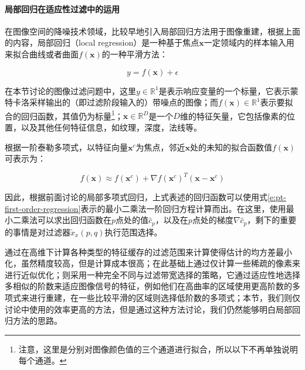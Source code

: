 \paragraph{局部回归在适应性过滤中的运用}
在图像空间的降噪技术领域，\cite{a:AdaptiveRenderingbasedonWeightedLocalRegression}比较早地引入局部回归方法用于图像重建，根据上面的内容，局部回归（local regression）是一种基于焦点$\mathbf{x}$一定领域内的样本输入用来拟合曲线或者曲面$f(\mathbf{x})$的一种平滑方法：

\begin{equation}
	y=f(\mathbf{x})+\epsilon
\end{equation}

\noindent 在本节讨论的图像过滤问题中，这里$y\in\mathbb{R}^{1}$是表示响应变量的一个标量，它表示蒙特卡洛采样输出的（即过滤阶段输入的）带噪点的图像；而$f(\mathbf{x})\in\mathbb{R}^{1}$表示要拟合的回归函数，其值仍为标量\footnote{注意，这里是分别对图像颜色值的三个通道进行拟合，所以以下不再单独说明每个通道。}；$\mathbf{x}\in\mathbb{R}^{D}$是一个$D$维的特征矢量，它包括像素的位置，以及其他任何特征信息，如纹理，深度，法线等。

根据一阶泰勒多项式，以特征向量$\mathbf{x}^{c}$为焦点，邻近$\mathbf{x}$处的未知的拟合函数值$f(\mathbf{x})$可表示为：

\begin{equation}
	f(\mathbf{x})\approx f(\mathbf{x}^{c})+\nabla f(\mathbf{x}^{c})^{T}(\mathbf{x}-\mathbf{x}^{c})
\end{equation}

\noindent 因此，根据前面讨论的局部多项式回归，上式表述的回归函数可以使用式\ref{e:pt-first-order-regression}表示的最小二乘法一阶回归方程计算而出。在这里，使用最小二乘法可以求出回归函数在$p$点处的值$\hat{c}_p$，以及在$p$点处的梯度$\nabla \hat{c}_p$，剩下的重要的事情是对过滤器$\tilde{x}_x(p,q)$执行范围选择。

\cite{a:AdaptiveRenderingbasedonWeightedLocalRegression}通过在高维下计算各种类型的特征缓存的过滤范围来计算使得估计的均方差最小化，虽然精度较高，但是计算成本很高；\cite{a:AdaptiveRenderingwithLinearPredictions}在此基础上通过仅计算一些稀疏的像素来进行近似优化；\cite{a:AdaptivePolynomialRendering}则采用一种完全不同与过滤带宽选择的策略，它通过适应性地选择多相似的阶数来适应图像信号的特征，例如他们在高曲率的区域使用更高阶数的多项式来进行重建，在一些比较平滑的区域则选择低阶数的多项式；本节，我们则仅讨论\cite{a:NonlinearlyWeightedFirstorderRegressionforDenoisingMonteCarloRenderings}中使用的效率更高的方法，但是通过这种方法讨论，我们仍然能够明白局部回归方法的思路。


